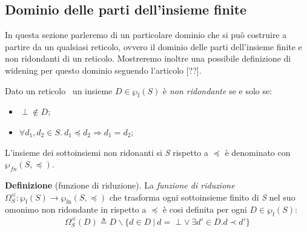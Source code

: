 \subsection{Dominio delle parti dell'insieme finite}
In questa sezione parleremo di un particolare dominio che si può costruire a partire da un qualsiasi reticolo, ovvero il dominio delle parti dell'insieme finite e non ridondanti di un reticolo. Mostreremo inoltre una possibile definizione di widening per questo dominio seguendo l'articolo [??].

\begin{definition}
Dato un reticolo \ un insieme \(D\in\wp_{\textrm{f}} (S)\) è \textit{non ridondante} se e solo se:
\begin{itemize}
	\item \(\perp\notin D\);
	\item \(\forall d_1, d_2 \in S.\ d_1\preceq d_2\Rightarrow d_1=d_2\);
\end{itemize}
L'insieme dei sottoinsiemi non ridonanti si \emph{S} rispetto a \(\preceq\) è denominato con \(\wp_{fn}(S, \preceq)\).
\end{definition}

\noindent\textbf{Definizione} (funzione di riduzione). La \emph{funzione di riduzione} \(\Omega_{S}^{\preceq} : \wp_{\textrm{f}}(S)\rightarrow\wp_{\textrm{fn}}(S, \preceq)\) che trasforma ogni sottoinsieme finito di \emph{S} nel suo omonimo non ridondante in rispetto a \(\preceq\) è cosi definita per ogni \(D\in\wp_{\textrm{f}}(S)\):
\[\Omega_{S}^{\preceq}(D) \triangleq D \backslash \lbrace d \in D     \ \vert\ d= \perp \vee\ \exists d'\in D . d\prec d' \rbrace\]

